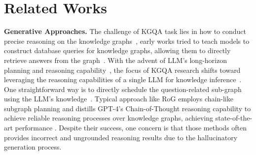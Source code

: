 \documentclass[11pt]{article}
\begin{document}

\section{Related Works}


\textbf{Generative Approaches.} The challenge of KGQA task lies in how to conduct precise reasoning on the knowledge graphs~\cite{miller-etal-2016-key,bai-etal-2022-graph,zhang-etal-2024-question}, early works tried to teach models to construct database queries for knowledge graphs, allowing them to directly retrieve answers from the graph~\cite{gu-su-2022-arcaneqa,ye-etal-2022-rng}. With the advent of LLM's long-horizon planning and reasoning capability~\cite{zhong2024memorybank, wang2024survey}, the focus of KGQA research shifts toward leveraging the reasoning capabilities of a single LLM for knowledge inference~\cite{jiang2022unikgqa}. One straightforward way is to directly schedule the question-related sub-graph using the LLM's knowledge~\cite{hong2023faithful,wang2023knowledgedrivencotexploringfaithful}. Typical approach like RoG employs chain-like subgraph planning and distills GPT-4’s Chain-of-Thought reasoning capability to achieve reliable reasoning processes over knowledge graphs, achieving state-of-the-art performance \citep{rog}. Despite their success, one concern is that those methods often provides incorrect and ungrounded reasoning results due to the hallucinatory generation process.

\end{document}
